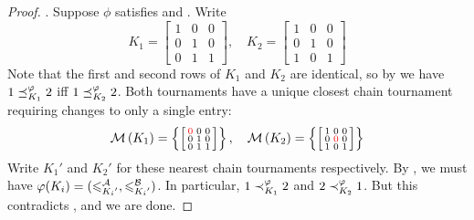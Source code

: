 \begin{proof}
    \iim{}. Suppose $\phi$ satisfies \chainmin{} and
    \iim{}. Write
    \[
         K_1 = \left[\begin{smallmatrix}
            1 & 0 & 0 \\
            0 & 1 & 0 \\
            0 & 1 & 1
         \end{smallmatrix}\right]
         , \quad
         K_2 = \left[\begin{smallmatrix}
            1 & 0 & 0 \\
            0 & 1 & 0 \\
            1 & 0 & 1
         \end{smallmatrix}\right]
    \]
    Note that the first and second rows of $K_1$ and $K_2$ are identical, so by
    \iim{} we have $1 \preceq_{K_1}^\varphi 2$ iff $1 \preceq_{K_2}^\varphi 2$.
    Both tournaments have a unique closest chain tournament requiring changes
    to only a single entry:
    \[
        \operatorname{\mathcal{M}}\left({K_1}\right) = \left\{
            \left[\begin{smallmatrix}
               \color{red}{0} & 0 & 0 \\
               0 & 1 & 0 \\
               0 & 1 & 1
            \end{smallmatrix}\right]
        \right\}
        , \quad
        \operatorname{\mathcal{M}}\left({K_2}\right) = \left\{
            \left[\begin{smallmatrix}
               1 & 0 & 0 \\
               0 & \color{red}{0} & 0 \\
               1 & 0 & 1
            \end{smallmatrix}\right]
        \right\}
    \]
    Write ${K_1}'$ and ${K_2}'$ for these nearest chain tournaments
    respectively. By \chainmin{}, we must have $\varphi(K_i) =
    ({\leqslant^{\mathcal{A}}_{{K_i}'}}, {\leqslant^{\mathcal{B}}_{{K_i}'}})$. In particular, $1
    \prec_{K_1}^\varphi 2$ and $2 \prec_{K_2}^\varphi 1$. But this contradicts
    \iim{}, and we are done.


\end{proof}
